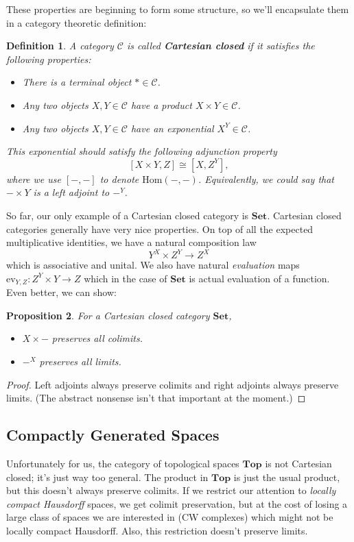 \documentclass[12pt]{article}
\providecommand{\Hom}{\mathrm{Hom}}
\providecommand{\CC}{\mathscr{C}}
\newtheorem{definition}{Definition}[subsection]
\newtheorem{proposition}[definition]{Proposition}
\begin{document}
These properties are beginning to form some structure, so we'll encapsulate them in a category theoretic definition:

\begin{definition}
  A category $\CC$ is called \textbf{Cartesian closed} if it satisfies the following properties:
  \begin{itemize}
    \item There is a terminal object $*\in \CC$.
    \item Any two objects $X,Y \in \CC$ have a product $X\times Y\in \CC$.
    \item Any two objects $X,Y \in \CC$ have an exponential $X^Y\in \CC$.
  \end{itemize}
  This exponential should satisfy the following adjunction property
  \[ [X\times Y, Z] \cong [X, Z^Y],\]
  where we use $[-,-]$ to denote $\Hom(-,-)$. Equivalently, we could say that $-\times Y$ is a left adjoint to $-^Y$.
\end{definition}

So far, our only example of a Cartesian closed category is $\mathbf{Set}$. Cartesian closed categories generally have very nice properties. On top of all the expected multiplicative identities, we have a natural composition law
\[Y^X \times Z^Y \to Z^X\]
which is associative and unital. We also have natural \emph{evaluation} maps $\textrm{ev}_{Y, Z} : Z^Y  \times Y \to Z$ which in the case of $\textbf{Set}$ is actual evaluation of a function. Even better, we can show:

\begin{proposition}
  For a Cartesian closed category $\mathbf{Set}$,
  \begin{itemize}
    \item $X\times -$ preserves all colimits.
    \item $-^X$ preserves all limits.
  \end{itemize}
\end{proposition}
\begin{proof}
  Left adjoints always preserve colimits and right adjoints always preserve limits. (The abstract nonsense isn't that important at the moment.)
\end{proof}

\subsection{Compactly Generated Spaces}

Unfortunately for us, the category of topological spaces $\mathbf{Top}$ is not Cartesian closed; it's just way too general. The product in $\mathbf{Top}$ is just the usual product, but this doesn't always preserve colimits. If we restrict our attention to \emph{locally compact Hausdorff} spaces, we get colimit preservation, but at the cost of losing a large class of spaces we are interested in (CW complexes) which might not be locally compact Hausdorff. Also, this restriction doesn't preserve limits.
\end{document}
